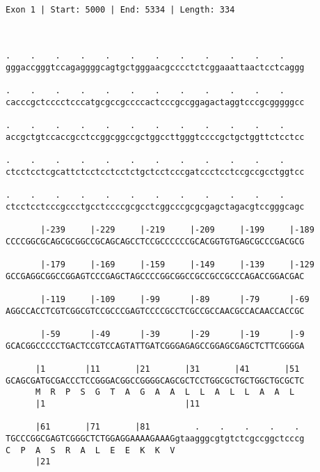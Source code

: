 \documentclass{article}
\begin{document}
 \begin{Verbatim}
 
Exon 1 | Start: 5000 | End: 5334 | Length: 334



.    .    .    .    .    .    .    .    .    .    .    .    
gggaccgggtccagaggggcagtgctgggaacgcccctctcggaaattaactcctcaggg
                                                            
.    .    .    .    .    .    .    .    .    .    .    .    
cacccgctcccctcccatgcgccgccccactcccgccggagactaggtcccgcgggggcc
                                                            
.    .    .    .    .    .    .    .    .    .    .    .    
accgctgtccaccgcctccggcggccgctggccttgggtccccgctgctggttctcctcc
                                                            
.    .    .    .    .    .    .    .    .    .    .    .    
ctcctcctcgcattctcctcctcctctgctcctcccgatccctcctccgccgcctggtcc
                                                            
.    .    .    .    .    .    .    .    .    .    .    .    
ctcctcctcccgccctgcctccccgcgcctcggcccgcgcgagctagacgtccgggcagc
                                                            
       |-239     |-229     |-219     |-209     |-199     |-189
CCCCGGCGCAGCGCGGCCGCAGCAGCCTCCGCCCCCCGCACGGTGTGAGCGCCCGACGCG
                                                            
       |-179     |-169     |-159     |-149     |-139     |-129
GCCGAGGCGGCCGGAGTCCCGAGCTAGCCCCGGCGGCCGCCGCCGCCCAGACCGGACGAC
                                                            
       |-119     |-109     |-99      |-89      |-79      |-69
AGGCCACCTCGTCGGCGTCCGCCCGAGTCCCCGCCTCGCCGCCAACGCCACAACCACCGC
                                                            
       |-59      |-49      |-39      |-29      |-19      |-9
GCACGGCCCCCTGACTCCGTCCAGTATTGATCGGGAGAGCCGGAGCGAGCTCTTCGGGGA
                                                            
      |1        |11       |21       |31       |41       |51 
GCAGCGATGCGACCCTCCGGGACGGCCGGGGCAGCGCTCCTGGCGCTGCTGGCTGCGCTC
      M  R  P  S  G  T  A  G  A  A  L  L  A  L  L  A  A  L  
      |1                            |11                     
  
      |61       |71       |81         .    .    .    .    . 
TGCCCGGCGAGTCGGGCTCTGGAGGAAAAGAAAGgtaagggcgtgtctcgccggctcccg
C  P  A  S  R  A  L  E  E  K  K  V                          
      |21                                                   
  

\end{Verbatim}
\end{document}
